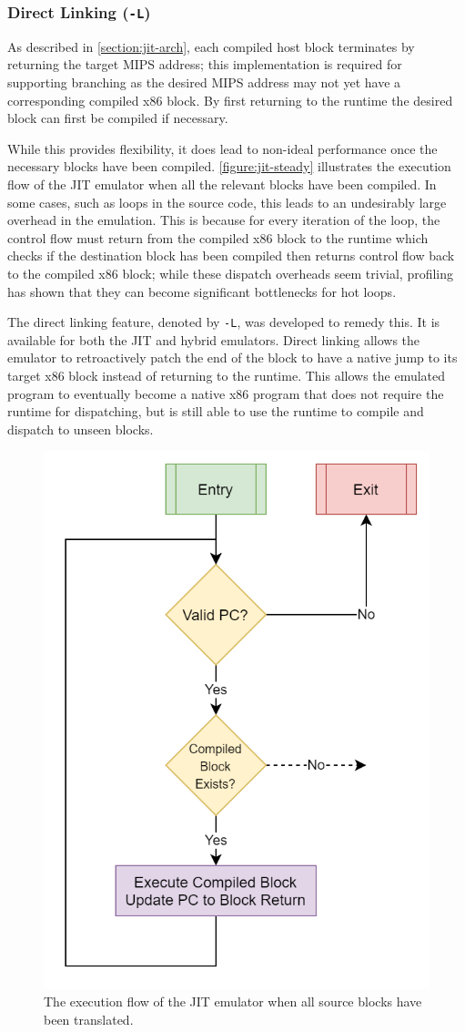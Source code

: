 \subsubsection{Direct Linking (\texttt{-L})}
\label{section:direct-linking}

As described in \autoref{section:jit-arch}, each compiled host block terminates by returning the target MIPS address; this implementation is required for supporting branching as the desired MIPS address may not yet have a corresponding compiled x86 block. By first returning to the runtime the desired block can first be compiled if necessary.

While this provides flexibility, it does lead to non-ideal performance once the necessary blocks have been compiled. \autoref{figure:jit-steady} illustrates the execution flow of the JIT emulator when all the relevant blocks have been compiled. In some cases, such as loops in the source code, this leads to an undesirably large overhead in the emulation. This is because for every iteration of the loop, the control flow must return from the compiled x86 block to the runtime which checks if the destination block has been compiled then returns control flow back to the compiled x86 block; while these dispatch overheads seem trivial, profiling has shown that they can become significant bottlenecks for hot loops.

The direct linking feature, denoted by \texttt{-L}, was developed to remedy this. It is available for both the JIT and hybrid emulators. Direct linking allows the emulator to retroactively patch the end of the block to have a native jump to its target x86 block instead of returning to the runtime. This allows the emulated program to eventually become a native x86 program that does not require the runtime for dispatching, but is still able to use the runtime to compile and dispatch to unseen blocks.

\begin{figure}[h]
    \centering
    \includegraphics[width=0.5\linewidth]{diagrams/jit-steady.png}
    \caption{The execution flow of the JIT emulator when all source blocks have been translated.}
    \label{figure:jit-steady}
\end{figure}

